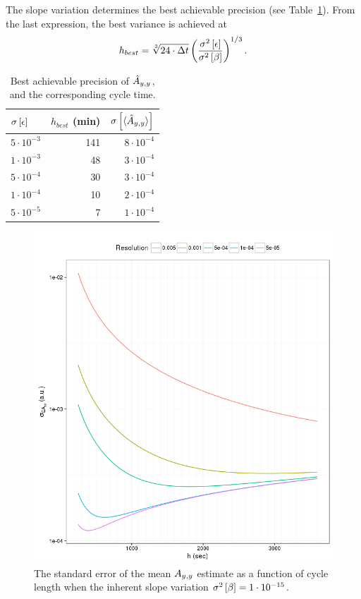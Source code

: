 \documentclass{report}
\begin{document}
The slope variation determines the best achievable precision (see Table~\ref{tbl:SEAyy_varb}). From the last expression, the best variance is achieved at
\begin{equation}
	h_{best} = \sqrt[3]{24\cdot \Tint} \bkt{\frac{\v{\err}}{\v{\slp}}}^{1/3}.
\end{equation}

\begin{table}[h]
\centering
\caption{Best achievable precision of $\Ayy*$,\\ and the corresponding cycle time.\label{tbl:SEAyy_varb}}
\begin{tabular}{lrr}
\hline\hline
$\SE{\err}$			&	$h_{best}$ (min)	& $\SE{\avg{\Ayy*}}$\\
\hline
$5\cdot10^{-3}$		&	141					& $8\cdot10^{-4}$\\
$1\cdot10^{-3}$		&	48					& $3\cdot10^{-4}$\\
$5\cdot10^{-4}$		&	30					& $3\cdot10^{-4}$\\
$1\cdot10^{-4}$		&	10					& $2\cdot10^{-4}$\\
$5\cdot10^{-5}$		&	7					& $1\cdot10^{-4}$\\
\hline
\end{tabular}
\end{table}

\begin{figure}[h]
\centering
\includegraphics[scale=.5]{SEAyy_varB_15min}
\caption{The standard error of the mean $\Ayy$ estimate as a function of cycle length when the inherent slope variation $\v{\slp} = 1\cdot10^{-15}$.\label{fig:SEAyy_varb}}
\end{figure}
\end{document}

